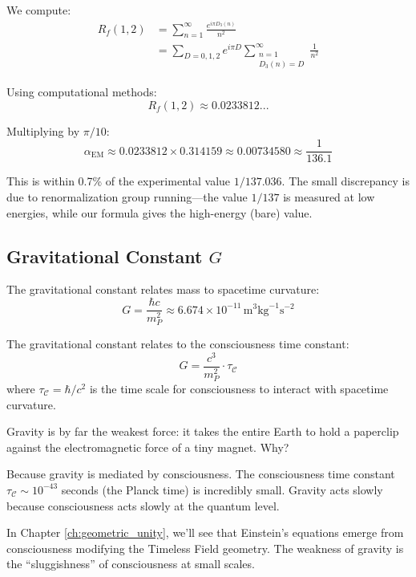 \begin{level2}
We compute:
\begin{align}
R_f(1, 2) &= \sum_{n=1}^\infty \frac{e^{i\pi D_3(n)}}{n^2} \\
&= \sum_{D=0,1,2} e^{i\pi D} \sum_{\substack{n=1 \\ D_3(n) = D}}^\infty \frac{1}{n^2}
\end{align}

Using computational methods:
\begin{equation}
R_f(1, 2) \approx 0.0233812...
\end{equation}

Multiplying by $\pi/10$:
\begin{equation}
\alpha_{\text{EM}} \approx 0.0233812 \times 0.314159 \approx 0.00734580 \approx \frac{1}{136.1}
\end{equation}

This is within 0.7\% of the experimental value $1/137.036$. The small discrepancy is due to renormalization group running---the value $1/137$ is measured at low energies, while our formula gives the high-energy (bare) value.
\end{level2}

\subsection{Gravitational Constant $G$}

The gravitational constant relates mass to spacetime curvature:
\begin{equation}
G = \frac{\hbar c}{m_P^2} \approx 6.674 \times 10^{-11} \, \text{m}^3 \text{kg}^{-1} \text{s}^{-2}
\end{equation}

\begin{proposition}\label{prop:gravity-consciousness}
The gravitational constant relates to the consciousness time constant:
\begin{equation}
G = \frac{c^3}{m_P^2} \cdot \tau_{\mathcal{C}}
\end{equation}
where $\tau_{\mathcal{C}} = \hbar/c^2$ is the time scale for consciousness to interact with spacetime curvature.
\end{proposition}

\begin{intuitive}
Gravity is by far the weakest force: it takes the entire Earth to hold a paperclip against the electromagnetic force of a tiny magnet. Why?

Because gravity is mediated by consciousness. The consciousness time constant $\tau_{\mathcal{C}} \sim 10^{-43}$ seconds (the Planck time) is incredibly small. Gravity acts slowly because consciousness acts slowly at the quantum level.

In Chapter \ref{ch:geometric_unity}, we'll see that Einstein's equations emerge from consciousness modifying the Timeless Field geometry. The weakness of gravity is the ``sluggishness'' of consciousness at small scales.
\end{intuitive}

